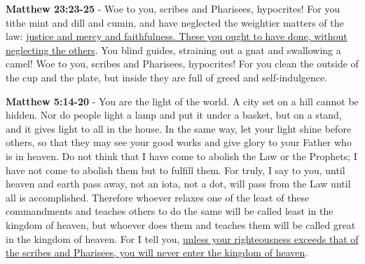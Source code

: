 \documentclass[11pt]{article}
\begin{document}
\textbf{Matthew 23:23-25} - Woe to you, scribes and Pharisees, hypocrites! For you tithe mint and dill and cumin, and have neglected the weightier matters of the law: \uline{justice and mercy and faithfulness. These you ought to have done, without neglecting the others}.  You blind guides, straining out a gnat and swallowing a camel!  Woe to you, scribes and Pharisees, hypocrites! For you clean the outside of the cup and the plate, but inside they are full of greed and self-indulgence.

\textbf{Matthew 5:14-20} - You are the light of the world. A city set on a hill cannot be hidden. Nor do people light a lamp and put it under a basket, but on a stand, and it gives light to all in the house. In the same way, let your light shine before others, so that they may see your good works and give glory to your Father who is in heaven. Do not think that I have come to abolish the Law or the Prophets; I have not come to abolish them but to fulfill them. For truly, I say to you, until heaven and earth pass away, not an iota, not a dot, will pass from the Law until all is accomplished. Therefore whoever relaxes one of the least of these commandments and teaches others to do the same will be called least in the kingdom of heaven, but whoever does them and teaches them will be called great in the kingdom of heaven. For I tell you, \uline{unless your righteousness exceeds that of the scribes and Pharisees, you will never enter the kingdom of heaven}.
\end{document}
